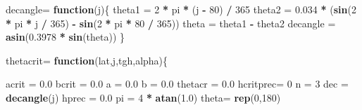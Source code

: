 \documentclass[]{book}
\newenvironment{Shaded}{\begin{snugshade}}{\end{snugshade}}
\newcommand{\KeywordTok}[1]{\textcolor[rgb]{0.13,0.29,0.53}{\textbf{#1}}}
\newcommand{\DecValTok}[1]{\textcolor[rgb]{0.00,0.00,0.81}{#1}}
\newcommand{\FloatTok}[1]{\textcolor[rgb]{0.00,0.00,0.81}{#1}}
\newcommand{\StringTok}[1]{\textcolor[rgb]{0.31,0.60,0.02}{#1}}
\newcommand{\ControlFlowTok}[1]{\textcolor[rgb]{0.13,0.29,0.53}{\textbf{#1}}}
\newcommand{\OperatorTok}[1]{\textcolor[rgb]{0.81,0.36,0.00}{\textbf{#1}}}
\newcommand{\NormalTok}[1]{#1}
\theoremstyle{definition}
\theoremstyle{definition}
\theoremstyle{definition}
\theoremstyle{remark}
\begin{document}
\begin{Shaded}
\begin{Highlighting}[]
\NormalTok{decangle=}\StringTok{ }\ControlFlowTok{function}\NormalTok{(j)\{}
\NormalTok{  theta1 =}\StringTok{ }\DecValTok{2} \OperatorTok{*}\StringTok{ }\NormalTok{pi }\OperatorTok{*}\StringTok{ }\NormalTok{(j }\OperatorTok{-}\StringTok{ }\DecValTok{80}\NormalTok{) }\OperatorTok{/}\StringTok{ }\DecValTok{365}
\NormalTok{  theta2 =}\StringTok{ }\FloatTok{0.034} \OperatorTok{*}\StringTok{ }\NormalTok{(}\KeywordTok{sin}\NormalTok{(}\DecValTok{2} \OperatorTok{*}\StringTok{ }\NormalTok{pi }\OperatorTok{*}\StringTok{ }\NormalTok{j }\OperatorTok{/}\StringTok{ }\DecValTok{365}\NormalTok{) }\OperatorTok{-}\StringTok{ }\KeywordTok{sin}\NormalTok{(}\DecValTok{2} \OperatorTok{*}\StringTok{ }\NormalTok{pi }\OperatorTok{*}\StringTok{ }\DecValTok{80} \OperatorTok{/}\StringTok{ }\DecValTok{365}\NormalTok{))}
\NormalTok{  theta =}\StringTok{ }\NormalTok{theta1 }\OperatorTok{-}\StringTok{ }\NormalTok{theta2}
\NormalTok{  decangle =}\StringTok{ }\KeywordTok{asin}\NormalTok{(}\FloatTok{0.3978} \OperatorTok{*}\StringTok{ }\KeywordTok{sin}\NormalTok{(theta))}
\NormalTok{\}}

\NormalTok{thetacrit=}\StringTok{ }\ControlFlowTok{function}\NormalTok{(lat,j,tgh,alpha)\{}
  
\NormalTok{  acrit =}\StringTok{ }\FloatTok{0.0}
\NormalTok{  bcrit =}\StringTok{ }\FloatTok{0.0}
\NormalTok{  a =}\StringTok{ }\FloatTok{0.0}
\NormalTok{  b =}\StringTok{ }\FloatTok{0.0}
\NormalTok{  thetacr =}\StringTok{ }\FloatTok{0.0}
\NormalTok{  hcritprec=}\StringTok{ }\DecValTok{0}
\NormalTok{  n  =}\StringTok{ }\DecValTok{3}
\NormalTok{  dec =}\StringTok{ }\KeywordTok{decangle}\NormalTok{(j)}
\NormalTok{  hprec =}\StringTok{ }\FloatTok{0.0}
\NormalTok{  pi =}\StringTok{ }\DecValTok{4} \OperatorTok{*}\StringTok{ }\KeywordTok{atan}\NormalTok{(}\FloatTok{1.0}\NormalTok{)}
\NormalTok{  theta=}\StringTok{ }\KeywordTok{rep}\NormalTok{(}\DecValTok{0}\NormalTok{,}\DecValTok{180}\NormalTok{)}
  

\end{Highlighting}
\end{Shaded}
\end{document}
